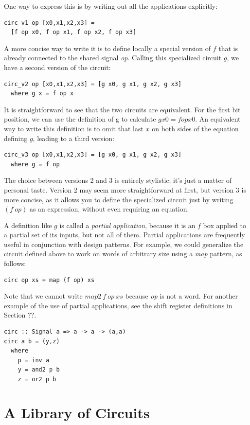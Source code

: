 \documentclass[a4paper,openany,fleqn]{book}
\begin{document}
One way to express this is by writing out all the applications
explicitly:
\begin{verbatim}
circ_v1 op [x0,x1,x2,x3] =
  [f op x0, f op x1, f op x2, f op x3]
\end{verbatim}
A more concise way to write it is to define locally a special version
of $f$ that is already connected to the shared signal \textit{op}.
Calling this specialized circuit $g$, we have a second version of the
circuit:
\begin{verbatim}
circ_v2 op [x0,x1,x2,x3] = [g x0, g x1, g x2, g x3]
  where g x = f op x
\end{verbatim}
It is straightforward to see that the two circuits are equivalent.
For the first bit position, we can use the definition of g to
calculate $g x0 = f op x0$.  An equivalent way to write this
definition is to omit that last $x$ on both sides of the equation
defining $g$, leading to a third version:
\begin{verbatim}
circ_v3 op [x0,x1,x2,x3] = [g x0, g x1, g x2, g x3]
  where g = f op
\end{verbatim}
The choice between versions 2 and 3 is entirely stylistic; it's just a
matter of personal taste.  Version 2 may seem more straightforward at
first, but version 3 is more concise, as it allows you to define the
specialized circuit just by writing $(f\ \mathit{op})$ as an
expression, without even requiring an equation.

A definition like $g$ is called a \textit{partial application},
because it is an $f$ box applied to a partial set of its inputs, but
not all of them.  Partial applications are frequently useful in
conjunction with design patterns.  For example, we could generalize
the circuit defined above to work on words of arbitrary size using a
\textit{map} pattern, as follows:
\begin{verbatim}
circ op xs = map (f op) xs
\end{verbatim}
Note that we cannot write $\mathit{map2}\ f\ \mathit{op}\ \mathit{xs}$
because \textit{op} is not a word.  For another example of the use of
partial applications, see the shift register definitions in Section
??.

\begin{verbatim}
circ :: Signal a => a -> a -> (a,a)
circ a b = (y,z)
  where
    p = inv a
    y = and2 p b
    z = or2 p b
\end{verbatim}


\chapter{A Library of Circuits}
\label{cha:library-circuits}
\end{document}
